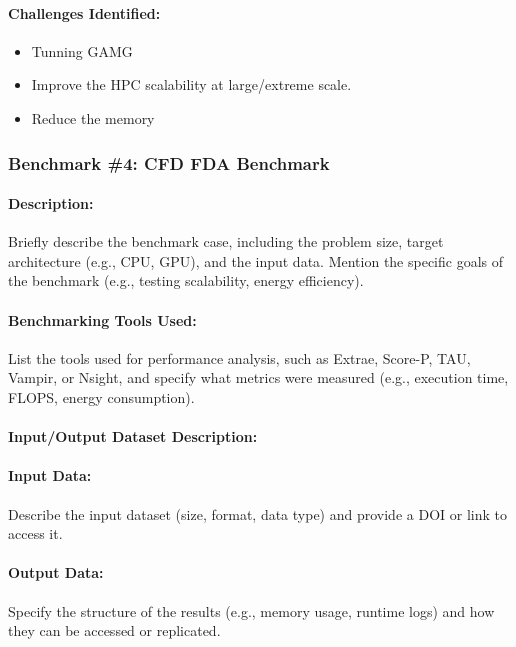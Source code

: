 \paragraph{Challenges Identified:} %


\begin{itemize}
\item Tunning GAMG
\item Improve the HPC scalability at large/extreme scale.
\item Reduce the memory
\end{itemize}

\iffalse
\subsubsection{Benchmark \#4: CFD FDA Benchmark}

\paragraph{Description:} Briefly describe the benchmark case, including the problem size, target architecture (e.g., CPU, GPU), and the input data. Mention the specific goals of the benchmark (e.g., testing scalability, energy efficiency).

\paragraph{Benchmarking Tools Used:} List the tools used for performance analysis, such as Extrae, Score-P, TAU, Vampir, or Nsight, and specify what metrics were measured (e.g., execution time, FLOPS, energy consumption).

\paragraph{Input/Output Dataset Description:}
\paragraph{Input Data:} Describe the input dataset (size, format, data type) and provide a DOI or link to access it.

\paragraph{Output Data:} Specify the structure of the results (e.g., memory usage, runtime logs) and how they can be accessed or replicated.

